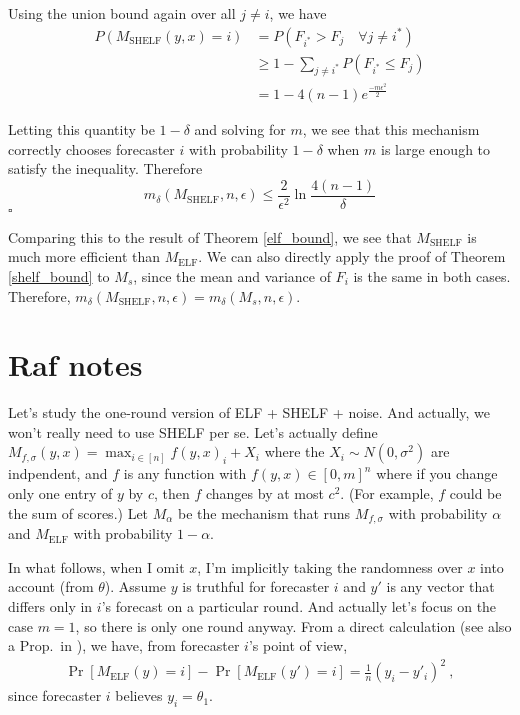 \documentclass[letterpaper,12pt]{article}
\newcommand{\1}{\mathbbm{1}}
\newcommand*{\QED}{\hfill\ensuremath{\square}}%
\newcommand{\elf}{M_{\mathrm{ELF}}}
\newcommand{\shelf}{M_{\mathrm{SHELF}}}
\begin{document}
Using the union bound again over all $j \neq i$, we have 
\begin{align*}
  P(\shelf(y, x) = i) &= P(F_{i^*} > F_j \quad \forall j \neq i^*) \\
                      &\geq 1 - \sum_{j\neq i^*} P(F_{i^*} \leq F_j) \\
                      &= 1 - 4 (n-1) e^{\frac{- m \epsilon^2}{2}}
\end{align*}

Letting this quantity be $1 - \delta$ and solving for $m$, we see that this mechanism correctly chooses forecaster $i$ with probability $1 - \delta$ when $m$ is large enough to satisfy the inequality. Therefore
\[ m_\delta(\shelf, n, \epsilon) \leq \frac{2}{\epsilon^2} \ln \frac{4(n-1)}{\delta} \]
\hfill \QED

Comparing this to the result of Theorem \ref{elf_bound}, we see that $\shelf$ is much more efficient than $\elf$. We can also directly apply the proof of Theorem \ref{shelf_bound} to $M_s$, since the mean and variance of $F_i$ is the same in both cases. Therefore, $m_\delta(\shelf, n, \epsilon) = m_\delta(M_s, n, \epsilon)$. 

\newpage
\section{Raf notes}

Let's study the one-round version of ELF + SHELF + noise.
And actually, we won't really need to use SHELF per se.
Let's actually define
$M_{f,\sigma}(y,x) = \max_{i\in[n]} f(y,x)_i + X_i$ where the $X_i \sim N(0,\sigma^2)$ are indpendent, and $f$ is any function with $f(y,x) \in [0,m]^n$ where if you change only one entry of $y$ by $c$, then $f$ changes by at most $c^2$.
(For example, $f$ could be the sum of scores.)
Let $M_\alpha$ be the mechanism that runs $M_{f,\sigma}$ with probability $\alpha$ and $\elf$ with probability $1-\alpha$.

In what follows, when I omit $x$, I'm implicitly taking the randomness over $x$ into account (from $\theta$).
Assume $y$ is truthful for forecaster $i$ and $y'$ is any vector that differs only in $i$'s forecast on a particular round.
And actually let's focus on the case $m=1$, so there is only one round anyway.
From a direct calculation (see also a Prop.\ in \cite{witkowski2018incentive}), we have, from forecaster $i$'s point of view,
\begin{align}
  \Pr[\elf(y)=i] - \Pr[\elf(y')=i] = \tfrac 1 n (y_i - y'_i)^2~,
\end{align}
since forecaster $i$ believes $y_i = \theta_1$.
\end{document}
